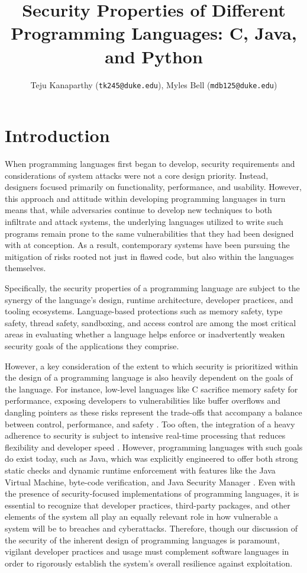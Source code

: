 \documentclass[conference]{IEEEtran}
\title{Security Properties of Different Programming Languages: C, Java, and Python}
\author{Teju Kanaparthy (\texttt{tk245@duke.edu}), Myles Bell (\texttt{mdb125@duke.edu})}
\begin{document}
\maketitle

\section{Introduction}
When programming languages first began to develop, security requirements and considerations of system attacks were not a core design priority. Instead, designers focused primarily on functionality, performance, and usability. However, this approach and attitude within developing programming languages in turn means that, while adversaries continue to develop new techniques to both infiltrate and attack systems, the underlying languages utilized to write such programs remain prone to the same vulnerabilities that they had been designed with at conception. As a result, contemporary systems have been pursuing the mitigation of risks rooted not just in flawed code, but also within the languages themselves.

Specifically, the security properties of a programming language are subject to the synergy of the language's design, runtime architecture, developer practices, and tooling ecosystems. Language-based protections such as memory safety, type safety, thread safety, sandboxing, and access control are among the most critical areas in evaluating whether a language helps enforce or inadvertently weaken security goals of the applications they comprise.

However, a key consideration of the extent to which security is prioritized within the design of a programming language is also heavily dependent on the goals of the language. For instance, low-level languages like C sacrifice memory safety for performance, exposing developers to vulnerabilities like buffer overflows and dangling pointers as these risks represent the trade-offs that accompany a balance between control, performance, and safety \cite{Bocetta2020}. Too often, the integration of a heavy adherence to security is subject to intensive real-time processing that reduces flexibility and developer speed \cite{Hamilton2015}. However, programming languages with such goals do exist today, such as Java, which was explicitly engineered to offer both strong static checks and dynamic runtime enforcement with features like the Java Virtual Machine, byte-code verification, and Java Security Manager \cite{Sterbenz2000}. Even with the presence of security-focused implementations of programming languages, it is essential to recognize that developer practices, third-party packages, and other elements of the system all play an equally relevant role in how vulnerable a system will be to breaches and cyberattacks. Therefore, though our discussion of the security of the inherent design of programming languages is paramount, vigilant developer practices and usage must complement software languages in order to rigorously establish the system’s overall resilience against exploitation.
\end{document}

